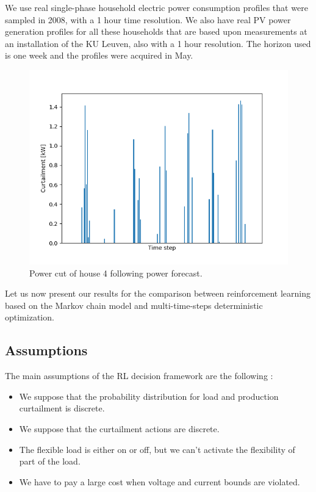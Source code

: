 We use real single-phase household electric power consumption profiles 
that were sampled in 2008, with a 1 hour time resolution.
We also have real PV power generation profiles for all these households that are based upon measurements at an installation of the KU Leuven, also with a 1 hour resolution.
The horizon used is one week and the profiles were acquired in May.

\begin{figure}
  \begin{center}
    \includegraphics[scale=0.7]{./img/power_cut.png}
  \end{center}
  \caption{Power cut of house 4 following power forecast.}
  \label{fig:power_cut}
\end{figure}

Let us now present our results for the comparison between reinforcement learning based on the Markov chain model and multi-time-steps deterministic optimization.

\subsection{Assumptions}

The main assumptions of the RL decision framework are the following :
\begin{itemize}
\item We suppose that the probability distribution for load and production curtailment is discrete.
\item We suppose that the curtailment actions are discrete.
\item The flexible load is either on or off, but we can't activate the flexibility of part of the load.
\item We have to pay a large cost when voltage and current bounds are violated.
\end{itemize}


